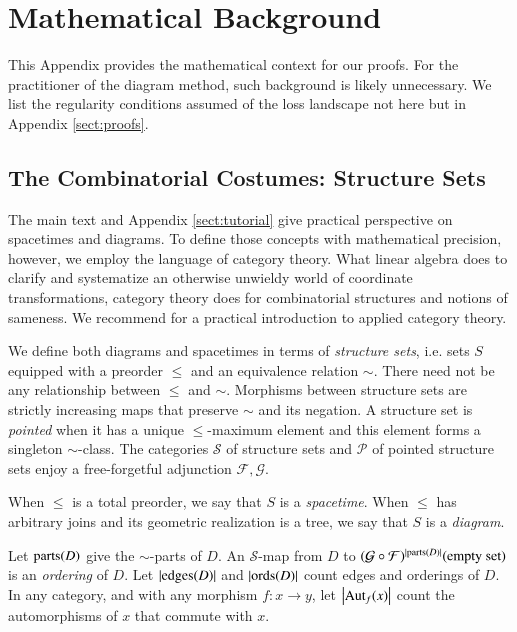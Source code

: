 \documentclass{article}
\theoremstyle{plain}
\theoremstyle{definition}
\newcommand{\Free}{\mathcal{F}}
\newcommand{\Forg}{\mathcal{G}}
\newcommand{\Aut}{\text{\textnormal{Aut}}}
\newcommand{\edges}{\text{\textnormal{edges}}}
\newcommand{\ords}{\text{\textnormal{ords}}}
\newcommand{\parts}{\text{\textnormal{parts}}}
\newcommand{\Pp}{\mathcal{P}}
\newcommand{\Ss}{\mathcal{S}}
\newcommand{\wabs}[1]{\left|#1\right|}
\begin{document}
\section{Mathematical Background} \label{sect:morebackground}
    This Appendix provides the mathematical context for our proofs.  For the
    practitioner of the diagram method, such background is likely unnecessary.
    We list the regularity conditions assumed of the loss landscape not here
    but in Appendix \ref{sect:proofs}.

    \subsection{The Combinatorial Costumes: Structure Sets}
        The main text and Appendix \ref{sect:tutorial} give practical
        perspective on spacetimes and diagrams.  To define those concepts with
        mathematical precision, however, we employ the language of category
        theory.  What linear algebra does to clarify and systematize an
        otherwise unwieldy world of coordinate transformations, category theory
        does for combinatorial structures and notions of sameness.  We
        recommend \citet{fo19} for a practical introduction to applied category
        theory.

        We define both diagrams and spacetimes in terms of \emph{structure
        sets}, i.e. sets $S$ equipped with a preorder $\leq$ and an equivalence
        relation $\sim$.  There need not be any relationship between $\leq$ and
        $\sim$.  Morphisms between structure sets are strictly increasing maps
        that preserve $\sim$ and its negation.  A structure set is
        \emph{pointed} when it has a unique $\leq$-maximum element and this
        element forms a singleton $\sim$-class.  The categories $\Ss$ of
        structure sets and $\Pp$ of pointed structure sets enjoy a
        free-forgetful adjunction $\Free, \Forg$.
        
        When $\leq$ is a total preorder, we say that $S$ is a \emph{spacetime}.
        When $\leq$ has arbitrary joins and its geometric realization is a
        tree, we say that $S$ is a \emph{diagram}. 
        
        Let $\parts(D)$ give the $\sim$-parts of $D$.  An $\Ss$-map from $D$ to
        $
            (\Forg\circ\Free)^{|\parts(D)|}(\text{empty set})
        $
        is an \emph{ordering} of $D$.  Let $|\edges(D)|$ and $|\ords(D)|$ count
        edges and orderings of $D$.  In any category, and with any morphism
        $f: x\to y$, let $\wabs{\Aut_f(x)}$ count the automorphisms of $x$
        that commute with $x$.
    
\end{document}
